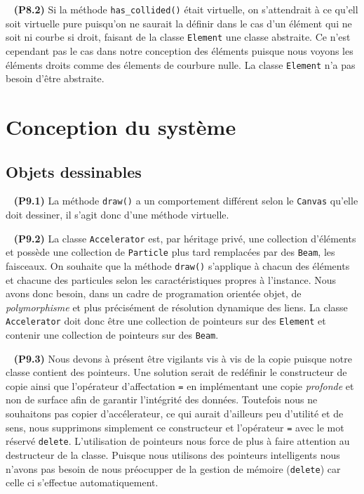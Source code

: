 \documentclass[12pt, letterpaper, twoside]{article}
\newcommand{\T}[1]{\texttt{#1}}
\begin{document}
\ \linebreak
\noindent \textbf{(P8.2)} Si la méthode \T{has\_collided()} était virtuelle, on s'attendrait à ce qu'ell soit virtuelle pure puisqu'on ne saurait la définir dans le cas d'un élément qui ne soit ni courbe si droit, faisant de la classe \T{Element} une classe abstraite. Ce n'est cependant pas le cas dans notre conception des éléments puisque nous voyons les éléments droits comme des élements de courbure nulle. La classe \T{Element} n'a pas besoin d'être abstraite.

\section{Conception du système}

\subsection{Objets dessinables}

\ \linebreak
\noindent \textbf{(P9.1)} La méthode \T{draw()} a un comportement différent selon le \T{Canvas} qu'elle doit dessiner, il s'agit donc d'une méthode virtuelle.

\ \linebreak
\noindent \textbf{(P9.2)} La classe \T{Accelerator} est, par héritage privé, une collection d'éléments et possède une collection de \T{Particle} plus tard remplacées par des \T{Beam}, les faisceaux. On souhaite que la méthode \T{draw()} s'applique à chacun des éléments et chacune des particules selon les caractéristiques propres à l'instance. Nous avons donc besoin, dans un cadre de programation orientée objet, de \emph{polymorphisme} et plus précisément de résolution dynamique des liens. La classe \T{Accelerator} doit donc être une collection de pointeurs sur des \T{Element} et contenir une collection de pointeurs sur des \T{Beam}. 

\ \linebreak
\noindent \textbf{(P9.3)} Nous devons à présent être vigilants vis à vis de la copie puisque notre classe contient des pointeurs. Une solution serait de redéfinir le constructeur de copie ainsi que l'opérateur d'affectation \T{=} en implémentant une copie \emph{profonde} et non de surface afin de garantir l'intégrité des données. Toutefois nous ne souhaitons pas copier d'accélerateur, ce qui aurait d'ailleurs peu d'utilité et de sens, nous supprimons simplement ce constructeur et l'opérateur \T{=} avec le mot réservé \T{delete}. L'utilisation de pointeurs nous force de plus à faire attention au destructeur de la classe. Puisque nous utilisons des pointeurs intelligents nous n'avons pas besoin de nous préocupper de la gestion de mémoire (\T{delete}) car celle ci s'effectue automatiquement. 
\end{document}
